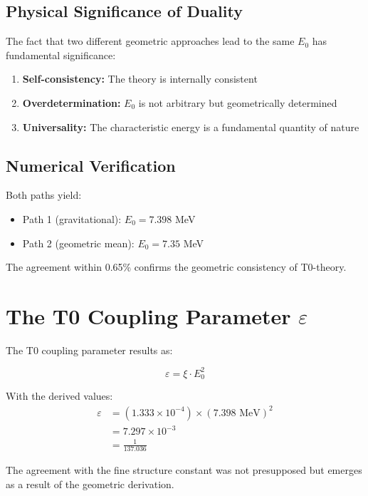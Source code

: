 \documentclass[12pt,a4paper]{article}
\begin{document}
	\subsection{Physical Significance of Duality}
	
	The fact that two different geometric approaches lead to the same $E_0$ has fundamental significance:
	
	\begin{enumerate}
		\item \textbf{Self-consistency:} The theory is internally consistent
		\item \textbf{Overdetermination:} $E_0$ is not arbitrary but geometrically determined
		\item \textbf{Universality:} The characteristic energy is a fundamental quantity of nature
	\end{enumerate}
	
	\subsection{Numerical Verification}
	
	Both paths yield:
	\begin{itemize}
		\item Path 1 (gravitational): $E_0 = 7.398$ MeV
		\item Path 2 (geometric mean): $E_0 = 7.35$ MeV
	\end{itemize}
	
	The agreement within 0.65\% confirms the geometric consistency of T0-theory.
	
	\section{The T0 Coupling Parameter $\varepsilon$}
	
	The T0 coupling parameter results as:
	
	\begin{equation}
		\varepsilon = \xi \cdot E_0^2
	\end{equation}
	
	With the derived values:
	\begin{align}
		\varepsilon &= (1.333 \times 10^{-4}) \times (7.398 \text{ MeV})^2\\
		&= 7.297 \times 10^{-3}\\
		&= \frac{1}{137.036}
	\end{align}
	
	The agreement with the fine structure constant was not presupposed but emerges as a result of the geometric derivation.
\end{document}
